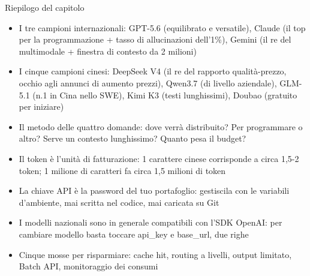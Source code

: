 \begin{tcbsummary}{Riepilogo del capitolo}
\begin{itemize}
  \item I tre campioni internazionali: GPT-5.6 (equilibrato e versatile), Claude (il top per la programmazione + tasso di allucinazioni dell'1\%), Gemini (il re del multimodale + finestra di contesto da 2 milioni)
  \item I cinque campioni cinesi: DeepSeek V4 (il re del rapporto qualità-prezzo, occhio agli annunci di aumento prezzi), Qwen3.7 (di livello aziendale), GLM-5.1 (n.1 in Cina nello SWE), Kimi K3 (testi lunghissimi), Doubao (gratuito per iniziare)
  \item Il metodo delle quattro domande: dove verrà distribuito? Per programmare o altro? Serve un contesto lunghissimo? Quanto pesa il budget?
  \item Il token è l'unità di fatturazione: 1 carattere cinese corrisponde a circa 1,5-2 token; 1 milione di caratteri fa circa 1,5 milioni di token
  \item La chiave API è la password del tuo portafoglio: gestiscila con le variabili d'ambiente, mai scritta nel codice, mai caricata su Git
  \item I modelli nazionali sono in generale compatibili con l'SDK OpenAI: per cambiare modello basta toccare api\_key e base\_url, due righe
  \item Cinque mosse per risparmiare: cache hit, routing a livelli, output limitato, Batch API, monitoraggio dei consumi
\end{itemize}

\end{tcbsummary}
